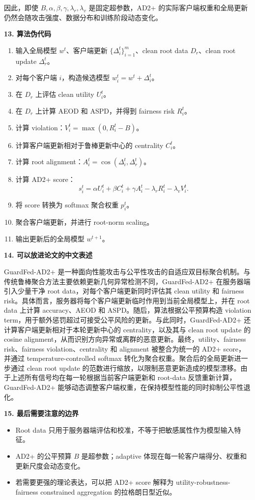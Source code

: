 \documentclass[11pt]{article}
\newcommand{\sectiontitle}[1]{%
  \vspace{0.9em}
  {\Large\bfseries\color{headblue} #1}\par
  \vspace{0.3em}
}
\begin{document}
因此，即使 $B,\alpha,\beta,\gamma,\lambda_r,\lambda_v$ 是固定超参数，AD2+ 的实际客户端权重和全局更新仍然会随攻击强度、数据分布和训练阶段动态变化。

\sectiontitle{13. 算法伪代码}

\begin{enumerate}
  \item 输入全局模型 $w^t$、客户端更新 $\{\Delta_i^t\}_{i=1}^m$、clean root data $D_r$、clean root update $\Delta_r^t$。
  \item 对每个客户端 $i$，构造候选模型 $w_i^t=w^t+\Delta_i^t$。
  \item 在 $D_r$ 上评估 clean utility $U_i^t$。
  \item 在 $D_r$ 上计算 AEOD 和 ASPD，并得到 fairness risk $R_i^t$。
  \item 计算 violation：$V_i^t=\max(0,R_i^t-B)$。
  \item 计算客户端更新相对于鲁棒更新中心的 centrality $C_i^t$。
  \item 计算 root alignment：$A_i^t=\cos(\Delta_i^t,\Delta_r^t)$。
  \item 计算 AD2+ score：
  \[
  s_i^t=\alpha U_i^t+\beta C_i^t+\gamma A_i^t-\lambda_r R_i^t-\lambda_v V_i^t .
  \]
  \item 将 score 转换为 softmax 聚合权重 $p_i^t$。
  \item 聚合客户端更新，并进行 root-norm scaling。
  \item 输出更新后的全局模型 $w^{t+1}$。
\end{enumerate}

\sectiontitle{14. 可以放进论文的中文表述}

GuardFed-AD2+ 是一种面向性能攻击与公平性攻击的自适应双目标聚合机制。与传统鲁棒聚合方法主要依赖更新几何异常检测不同，GuardFed-AD2+ 在服务器端引入少量干净 root data，对每个客户端更新同时评估其 clean utility 和 fairness risk。具体而言，服务器将每个客户端更新临时作用到当前全局模型上，并在 root data 上计算 accuracy、AEOD 和 ASPD。随后，算法根据公平预算构造 violation term，用于额外惩罚超过可接受公平风险的更新。与此同时，GuardFed-AD2+ 还计算客户端更新相对于本轮更新中心的 centrality，以及其与 clean root update 的 cosine alignment，从而识别方向异常或离群的恶意更新。最终，utility、fairness risk、fairness violation、centrality 和 alignment 被整合为统一的 AD2+ score，并通过 temperature-controlled softmax 转化为聚合权重。聚合后的全局更新进一步通过 clean root update 的范数进行缩放，以限制恶意更新造成的模型漂移。由于上述所有信号均在每一轮根据当前客户端更新和 root-data 反馈重新计算，GuardFed-AD2+ 能够动态调整客户端权重，在保持模型性能的同时抑制公平性退化。

\sectiontitle{15. 最后需要注意的边界}

\begin{itemize}
  \item Root data 只用于服务器端评估和校准，不等于把敏感属性作为模型输入特征。
  \item AD2+ 的公平预算 $B$ 是超参数；adaptive 体现在每一轮客户端得分、权重和更新尺度会动态变化。
  \item 若需要更强的理论表达，可以把 AD2+ score 解释为 utility-robustness-fairness constrained aggregation 的拉格朗日型近似。
\end{itemize}
\end{document}
